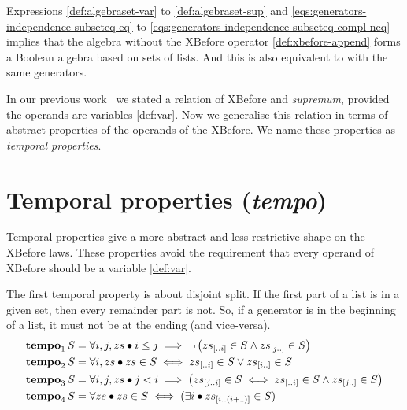 \documentclass[en,twoside,onehalfspacing,phd]{risethesis}
\makeatletter
\newcommand{\todo}[1]{\@latex@warning{TODO #1}}
\newcommand{\sliceright}[2]{\ensuremath #1_{\left[..#2\right]}}
\newcommand{\sliceleft}[2]{\ensuremath #1_{\left[#2..\right]}}
\newcommand{\slice}[3]{\ensuremath #1_{\left[#2..#3\right]}}
\def\tempotext{tempo\xspace}
\def\tempoop{\ensuremath\operatorname{\mathbf{tempo}}}
\newcommand{\tempo}[2][1-4]{\ensuremath\tempoop_{#1} #2}
\makeatother
\begin{document}
Expressions \eqref{def:algebraset-var} to \eqref{def:algebraset-sup} and \eqref{eqs:generators-independence-subseteq-eq} to \eqref{eqs:generators-independence-subseteq-compl-neq} implies that the \ac{algebra} without the XBefore operator \eqref{def:xbefore-append} forms a Boolean algebra based on sets of lists.
And this is also equivalent to  with the same generators.

In our previous work~\cite{DM2015} we stated a relation of XBefore and \emph{supremum}, provided the operands are variables \eqref{def:var}.
Now we generalise this relation in terms of abstract properties of the operands of the XBefore.
We name these properties as \emph{temporal properties}.

\section{Temporal properties (\emph{\tempotext})}
\label{sec:temporal-properties}

Temporal properties give a more abstract and less restrictive shape\todo{touch?} on the XBefore laws.
These properties avoid the requirement that every operand of XBefore should be a variable \eqref{def:var}.

The first temporal property is about disjoint split.
If the first part of a list is in a given set, then every remainder part is not.
So, if a generator is in the beginning of a list, it must not be at the ending (and vice-versa).
%
%
\begin{subequations}
\begin{align}
\tempo[1]{S} &= \forall i, j, zs \bullet
  i \le j \implies
  \lnot \left(
    \sliceright{zs}{i} \in S \land \sliceleft{zs}{j} \in S
  \right)\label{def:tempo1}\\
\tempo[2]{S} &= \forall i, zs \bullet
  zs \in S \iff
  \sliceright{zs}{i} \in S \lor \sliceleft{zs}{i} \in S\label{def:tempo2}\\
\tempo[3]{S} &= \forall i, j, zs \bullet
  j < i \implies
  \left(
    \slice{zs}{j}{i} \in S \iff \sliceright{zs}{i} \in S \land \sliceleft{zs}{j} \in S
  \right)\label{def:tempo3}\\
\tempo[4]{S} &= \forall zs \bullet zs \in S \iff (\exists i \bullet \slice{zs}{i}{\left(i+1\right)} \in S)\label{def:tempo4}
\end{align}
\end{subequations}
\end{document}
